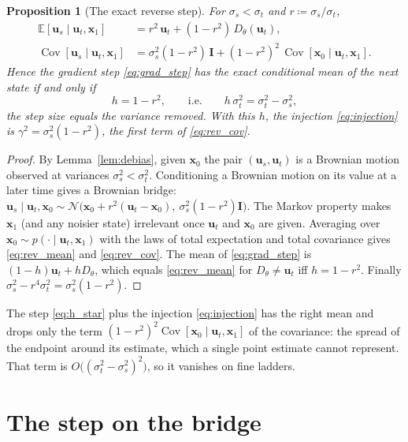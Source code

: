 \documentclass[11pt]{article}
\newtheorem{proposition}{Proposition}
\theoremstyle{definition}
\theoremstyle{remark}
\newcommand{\x}{\bm{x}}
\newcommand{\uu}{\bm{u}}
\newcommand{\E}{\mathbb{E}}
\newcommand{\N}{\mathcal{N}}
\newcommand{\Id}{\bm{I}}
\newcommand{\D}{D_\theta}
\newcommand{\Cov}{\operatorname{Cov}}
\begin{document}
\begin{proposition}[The exact reverse step]\label{prop:reverse}
For $\sigma_s<\sigma_t$ and $r \coloneqq \sigma_s/\sigma_t$,
\begin{align}
  \E[\uu_s\mid\uu_t,\x_1] &= r^2\,\uu_t + (1-r^2)\,\D(\uu_t),
  \label{eq:rev_mean}\\
  \Cov[\uu_s\mid\uu_t,\x_1] &= \sigma_s^2(1-r^2)\,\Id + (1-r^2)^2\,\Cov[\x_0\mid\uu_t,\x_1].
  \label{eq:rev_cov}
\end{align}
Hence the gradient step \eqref{eq:grad_step} has the exact conditional mean of the next state
if and only if
\begin{equation}
  h = 1 - r^2, \qquad\text{i.e.}\qquad h\,\sigma_t^2 = \sigma_t^2 - \sigma_s^2 ,
  \label{eq:h_star}
\end{equation}
the step size equals the variance removed. With this $h$, the injection
\eqref{eq:injection} is $\gamma^2 = \sigma_s^2(1-r^2)$, the first term of \eqref{eq:rev_cov}.
\end{proposition}
\begin{proof}
By Lemma~\ref{lem:debias}, given $\x_0$ the pair $(\uu_s,\uu_t)$ is a Brownian motion observed
at variances $\sigma_s^2<\sigma_t^2$. Conditioning a Brownian motion on its value at a later
time gives a Brownian bridge: $\uu_s\mid\uu_t,\x_0 \sim
\N\big(\x_0 + r^2(\uu_t-\x_0),\ \sigma_s^2(1-r^2)\Id\big)$. The Markov property makes
$\x_1$ (and any noisier state) irrelevant once $\uu_t$ and $\x_0$ are given. Averaging over
$\x_0\sim p(\cdot\mid\uu_t,\x_1)$ with the laws of total expectation and total covariance gives
\eqref{eq:rev_mean} and \eqref{eq:rev_cov}. The mean of \eqref{eq:grad_step} is
$(1-h)\uu_t + h\D$, which equals \eqref{eq:rev_mean} for $\D\ne\uu_t$ iff $h = 1-r^2$.
Finally $\sigma_s^2 - r^4\sigma_t^2 = \sigma_s^2(1-r^2)$.
\end{proof}

The step \eqref{eq:h_star} plus the injection \eqref{eq:injection} has the right mean and drops
only the term $(1-r^2)^2\Cov[\x_0\mid\uu_t,\x_1]$ of the covariance: the spread of the endpoint
around its estimate, which a single point estimate cannot represent. That term is
$O\big((\sigma_t^2-\sigma_s^2)^2\big)$, so it vanishes on fine ladders.

\section{The step on the bridge}\label{sec:bridge_step}
\end{document}
